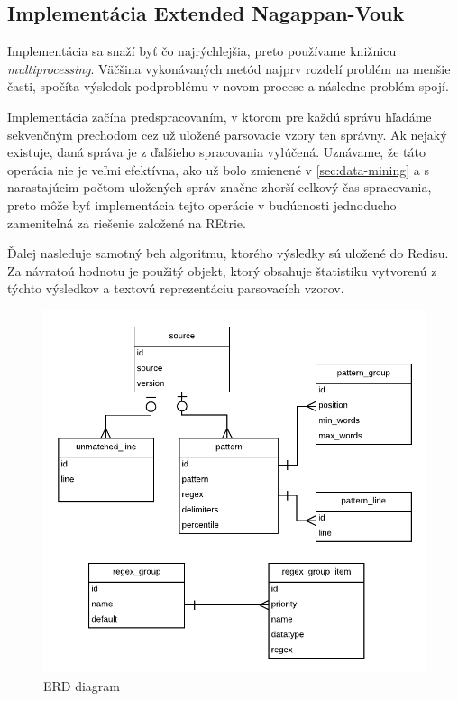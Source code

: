 \subsection{Implementácia Extended Nagappan-Vouk}
Implementácia sa snaží byť čo najrýchlejšia, preto používame knižnicu \emph{multiprocessing}. Väčšina vykonávaných metód najprv rozdelí problém na menšie časti, spočíta výsledok podproblému v novom procese a následne problém spojí. 
\par Implementácia začína predspracovaním, v ktorom pre každú správu hľadáme sekvenčným prechodom cez už uložené parsovacie vzory ten správny. Ak nejaký existuje, daná správa je z ďalšieho spracovania vylúčená. Uznávame, že táto operácia nie je veľmi efektívna, ako už bolo zmienené v \ref{sec:data-mining} a s narastajúcim počtom uložených správ značne zhorší celkový čas spracovania, preto môže byť implementácia tejto operácie v budúcnosti jednoducho zameniteľná za riešenie založené na REtrie.
\par Ďalej nasleduje samotný beh algoritmu, ktorého výsledky sú uložené do Redisu. Za návratoú hodnotu je použitý objekt, ktorý obsahuje štatistiku vytvorenú z týchto výsledkov a textovú reprezentáciu parsovacích vzorov.

\begin{figure}[htbp]
 \centering 
 \begin{minipage}{0.95\linewidth}
 	\centering
 	\includegraphics[width=\textwidth]{Images/thesis-erd.pdf}
 \end{minipage}
  \caption{ERD diagram}
  \label{fig:use-cases}
\end{figure}

